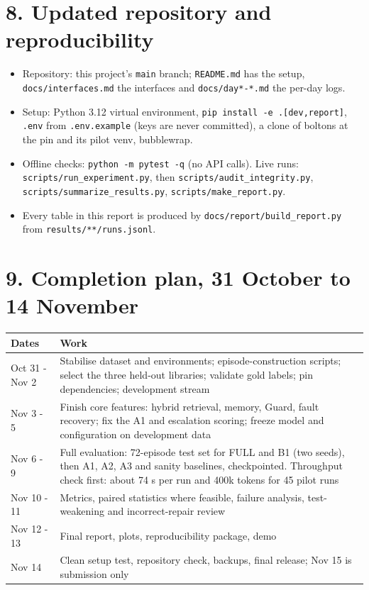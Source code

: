 \documentclass[10pt,a4paper]{article}
\begin{document}
\section*{8. Updated repository and reproducibility}
\begin{itemize}
\item Repository: this project's \texttt{main} branch; \texttt{README.md} has the setup, \texttt{docs/interfaces.md} the interfaces and \texttt{docs/day*-*.md} the per-day logs.
\item Setup: Python 3.12 virtual environment, \texttt{pip install -e .[dev,report]}, \texttt{.env} from \texttt{.env.example} (keys are never committed), a clone of boltons at the pin and its pilot venv, bubblewrap.
\item Offline checks: \texttt{python -m pytest -q} (no API calls). Live runs: \texttt{scripts/run\_experiment.py}, then \texttt{scripts/audit\_integrity.py}, \texttt{scripts/summarize\_results.py}, \texttt{scripts/make\_report.py}.
\item Every table in this report is produced by \texttt{docs/report/build\_report.py} from \texttt{results/**/runs.jsonl}.
\end{itemize}
\section*{9. Completion plan, 31 October to 14 November}
\begin{longtable}{|>{\raggedright\arraybackslash\footnotesize}p{}>{\raggedright\arraybackslash\footnotesize}p{}|}
\hline
\textbf{Dates} & \textbf{Work} \\ \hline\endhead
Oct 31 - Nov 2 & Stabilise dataset and environments; episode-construction scripts; select the three held-out libraries; validate gold labels; pin dependencies; development stream \\ \hline
Nov 3 - 5 & Finish core features: hybrid retrieval, memory, Guard, fault recovery; fix the A1 and escalation scoring; freeze model and configuration on development data \\ \hline
Nov 6 - 9 & Full evaluation: 72-episode test set for FULL and B1 (two seeds), then A1, A2, A3 and sanity baselines, checkpointed. Throughput check first: about 74 s per run and 400k tokens for 45 pilot runs \\ \hline
Nov 10 - 11 & Metrics, paired statistics where feasible, failure analysis, test-weakening and incorrect-repair review \\ \hline
Nov 12 - 13 & Final report, plots, reproducibility package, demo \\ \hline
Nov 14 & Clean setup test, repository check, backups, final release; Nov 15 is submission only \\ \hline
\end{longtable}
\end{document}
